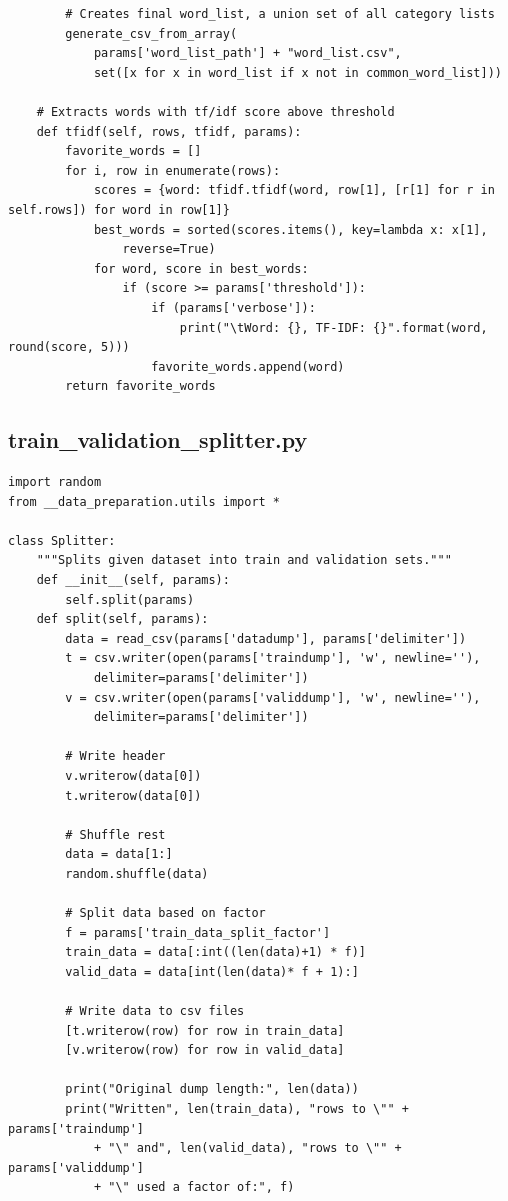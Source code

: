 \documentclass[journal]{IEEEtran}
\begin{document}
\begin{lstlisting}
		# Creates final word_list, a union set of all category lists
		generate_csv_from_array(
			params['word_list_path'] + "word_list.csv",
			set([x for x in word_list if x not in common_word_list]))

	# Extracts words with tf/idf score above threshold
	def tfidf(self, rows, tfidf, params):
		favorite_words = []
		for i, row in enumerate(rows):
			scores = {word: tfidf.tfidf(word, row[1], [r[1] for r in self.rows]) for word in row[1]}
			best_words = sorted(scores.items(), key=lambda x: x[1],
				reverse=True)
			for word, score in best_words:
				if (score >= params['threshold']):
					if (params['verbose']):
						print("\tWord: {}, TF-IDF: {}".format(word, round(score, 5)))
					favorite_words.append(word)
		return favorite_words
\end{lstlisting}

\subsection*{train\_validation\_splitter.py}
\begin{lstlisting}
import random
from __data_preparation.utils import *

class Splitter:
	"""Splits given dataset into train and validation sets."""
	def __init__(self, params):
		self.split(params)
	def split(self, params):
		data = read_csv(params['datadump'], params['delimiter'])
		t = csv.writer(open(params['traindump'], 'w', newline=''),
			delimiter=params['delimiter'])
		v = csv.writer(open(params['validdump'], 'w', newline=''),
			delimiter=params['delimiter'])

		# Write header
		v.writerow(data[0])
		t.writerow(data[0])

		# Shuffle rest
		data = data[1:]
		random.shuffle(data)

		# Split data based on factor
		f = params['train_data_split_factor']
		train_data = data[:int((len(data)+1) * f)]
		valid_data = data[int(len(data)* f + 1):]

		# Write data to csv files
		[t.writerow(row) for row in train_data]
		[v.writerow(row) for row in valid_data]

		print("Original dump length:", len(data))
		print("Written", len(train_data), "rows to \"" + params['traindump']
			+ "\" and", len(valid_data), "rows to \"" + params['validdump']
			+ "\" used a factor of:", f)
\end{lstlisting}
\end{document}
